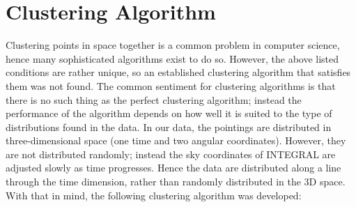 \documentclass{report}
\begin{document}
\section{Clustering Algorithm}
Clustering points in space together is a common problem in computer science, hence many sophisticated algorithms exist
to do so. However, the above listed conditions are rather unique, so an established clustering
algorithm that satisfies them was not found. The common sentiment for clustering algorithms is that there is no such thing as
the perfect clustering algorithm; instead the performance of the algorithm depends on how well it is suited to the type
of distributions found in the data. In our data, the pointings are distributed in three-dimensional space (one time and
two angular coordinates). However, they are not distributed randomly; instead the sky coordinates of INTEGRAL are
adjusted slowly as time progresses. Hence the data are distributed along a line through the time dimension, rather than
randomly distributed in the 3D space. With that in mind, the following clustering algorithm was developed:
\end{document}
